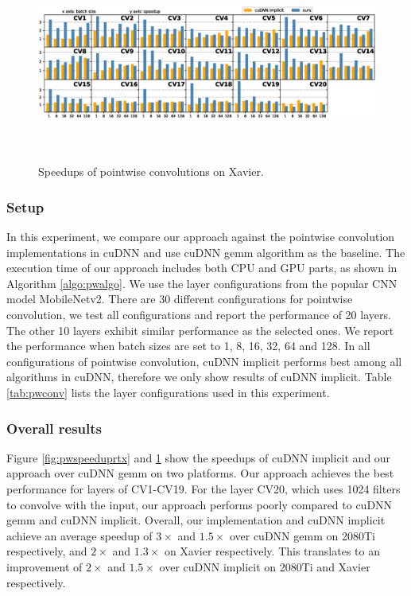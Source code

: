 \begin{figure}
	\centering
    \includegraphics[width=\textwidth,height=6.5cm]{./figure/pwspeedupjetson.eps}
    \caption{Speedups of pointwise convolutions on Xavier.} \label{fig:pwspeedupjetson}
\end{figure}

%	


\subsubsection{Setup} In this experiment, we compare our approach against the pointwise convolution implementations in cuDNN and use cuDNN gemm algorithm as the baseline. 
The execution time of our approach includes both CPU and GPU parts, as shown in Algorithm \ref{algo:pwalgo}.
We use the layer configurations from the popular CNN model MobileNetv2.
There are 30 different configurations for pointwise convolution, we test all configurations and report the performance of 20 layers. 
The other 10 layers exhibit similar performance as the selected ones.  
We report the performance when batch sizes are set to 1, 8, 16, 32, 64 and 128.
In all configurations of pointwise convolution, cuDNN implicit performs best among all algorithms in cuDNN, therefore we only show results of cuDNN implicit.
Table \ref{tab:pwconv} lists the layer configurations used in this experiment.

\subsubsection{Overall results} Figure \ref{fig:pwspeeduprtx} and \ref{fig:pwspeedupjetson} show the speedups of cuDNN implicit and our approach over cuDNN gemm on two platforms.
Our approach achieves the best performance for layers of CV1-CV19.
For the layer CV20, which uses 1024 filters to convolve with the input, our approach performs poorly compared to cuDNN gemm and cuDNN implicit.
Overall, our implementation and cuDNN implicit achieve an average speedup of $3\times$ and $1.5\times$ over cuDNN gemm on 2080Ti respectively, and $2\times$ and $1.3\times$ on Xavier respectively. 
This translates to an improvement of $2\times$ and $1.5\times$ over cuDNN implicit on 2080Ti and Xavier respectively.

